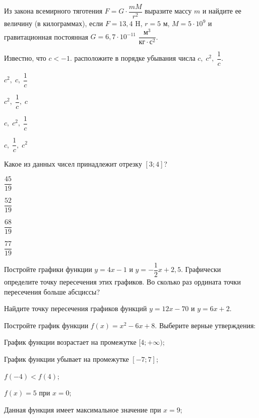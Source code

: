 %
%
\begin{class}[number=2]
	\begin{listofex}
		\item Из закона всемирного тяготения \( F=G\cdot\dfrac{mM}{r^2} \) выразите массу \( m \) и найдите ее величину (в килограммах), если \( F=13,4 \) H, \( r=5 \) м, \( M=5\cdot10^9 \) и гравитационная постоянная \( G=6,7\cdot10^{-11} \) \( \dfrac{\text{м}^3}{\text{кг}\cdot\text{с}^2} \).
		\item Известно, что \( c<-1 \). расположите в порядке убывания числа \( c,\; c^2,\; \dfrac{1}{c}\).
		\begin{enumcols}[itemcolumns=4]
			\item \( c^2,\; c,\; \dfrac{1}{c} \)
			\item \( c^2,\; \dfrac{1}{c},\; c \)
			\item \( c,\; c^2,\; \dfrac{1}{c} \)
			\item \( c,\; \dfrac{1}{c},\; c^2 \)
		\end{enumcols}
		\item Какое из данных чисел принадлежит отрезку \( [3;4] \)?
		\begin{enumcols}[itemcolumns=4]
			\item \( \dfrac{45}{19} \)
			\item \( \dfrac{52}{19} \)
			\item \( \dfrac{68}{19} \)
			\item \( \dfrac{77}{19} \)
		\end{enumcols}
		\item Постройте графики функции \( y=4x-1 \) и \( y=-\dfrac{1}{2}x+2,5 \). Графически определите точку пересечения этих графиков. Во сколько раз ордината точки пересечения больше абсциссы?
		\item Найдите точку пересечения графиков функций \( y=12x-70 \) и \( y=6x+2 \).
		\item Постройте график функции \( f(x)=x^2-6x+8 \). Выберите верные утверждения:
		\begin{enumcols}[itemcolumns=1]
			\item График функции возрастает на промежутке \( [4;+\infty) \);
			\item График функции убывает на промежутке \( [-7;7] \);
			\item \( f(-4)<f(4) \);
			\item \( f(x)=5 \) при \( x=0 \);
			\item Данная функция имеет максимальное значение при \( x=9 \);

\end{enumcols}
\end{listofex}
\end{class}
